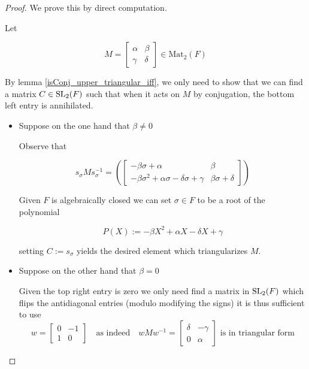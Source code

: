 \begin{proof}
We prove this by direct computation. 

Let 

\[
M = \begin{bmatrix}
\alpha & \beta\\
\gamma & \delta
\end{bmatrix} \in \textrm{Mat}_2(F)
\]

By lemma \ref{isConj_upper_triangular_iff}, we only need to show that we can find a matrix $C \in \operatorname{SL}_2(F)$ such that when it acts on $M$ by conjugation, the bottom left entry is annihilated.

\begin{itemize}
    \item Suppose on the one hand that $\beta \ne 0$
    
    Observe that 
    
    \begin{equation}\label{triang}
        s_\sigma M s_\sigma^{-1} = \left(\begin{bmatrix}
            -\beta \sigma + \alpha & \beta \\
            -\beta \sigma^{2} + \alpha \sigma - \delta \sigma + \gamma & \beta \sigma + \delta
            \end{bmatrix}\right)
    \end{equation}

    Given $F$ is algebraically closed we can set $\sigma \in F$ to be a root of the polynomial

    \[
    P(X) := -\beta X^{2} + \alpha X - \delta X + \gamma 
    \]

    setting $C := s_\sigma$ yields the desired element which triangularizes $M$.
    

    \item Suppose on the other hand that $\beta = 0$
    
    Given the top right entry is zero we only need find a matrix in $\operatorname{SL}_2(F)$ which flips the antidiagonal entries (modulo modifying the signs)
    it is thus sufficient to use 
        \[
        w = \begin{bmatrix}
        0 & -1\\
        1 & 0
        \end{bmatrix} \quad \text{as indeed} \quad w M w^{-1} = \begin{bmatrix}
            \delta & -\gamma\\
            0 & \alpha
        \end{bmatrix} \text{ is in triangular form} 
        \]
\end{itemize}

\end{proof}

